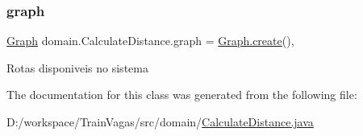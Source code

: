 \subsubsection{\texorpdfstring{graph}{graph}}
{\footnotesize\ttfamily \hyperlink{classdomain_1_1_graph}{Graph} domain.\+Calculate\+Distance.\+graph = \hyperlink{classdomain_1_1_graph_a57ce4efd344c059a565f4bb104fdee64}{Graph.\+create}()\hspace{0.3cm}{\ttfamily [static]}, {\ttfamily [package]}}

Rotas disponiveis no sistema 

The documentation for this class was generated from the following file\+:\begin{DoxyCompactItemize}
\item 
D\+:/workspace/\+Train\+Vagas/src/domain/\hyperlink{_calculate_distance_8java}{Calculate\+Distance.\+java}\end{DoxyCompactItemize}
